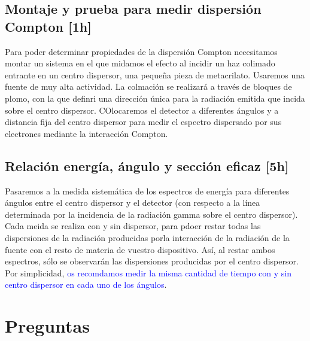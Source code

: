 \documentclass[11pt]{article}
\begin{document}
\subsection{Montaje y prueba para medir dispersión Compton [1h]}

Para poder determinar propiedades de la dispersión Compton necesitamos montar un sistema en el que midamos el efecto al incidir un haz colimado entrante en un centro dispersor, una pequeña pieza de metacrilato. Usaremos una fuente de muy alta actividad. La colmación se realizará a través de bloques de plomo, con la que definri una dirección única para la radiación emitida que incida sobre el centro dispersor. COlocaremos el detector a diferentes ángulos y a distancia fija del centro dispersor para medir el espectro dispersado por sus electrones mediante la interacción Compton. 

\subsection{Relación energía, ángulo y sección eficaz [5h]}

Pasaremos a la medida sistemática de los espectros de energía para diferentes ángulos entre el centro dispersor y el detector (con respecto a la línea determinada por la incidencia de la radiación gamma sobre el centro dispersor). Cada meida se realiza con y sin dispersor, para pdoer restar todas las dispersiones de la radiación producidas porla interacción de la radiación de la fuente con el resto de materia de vuestro dispositivo. Así, al restar ambos espectros, sólo se observarán las dispersiones producidas por el centro dispersor. Por simplicidad, \textcolor{Blue}{os recomdamos medir la misma cantidad de tiempo con y sin centro dispersor en cada uno de los ángulos}.



\newpage



\section{Preguntas}
\end{document}
